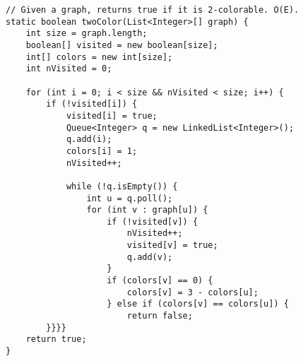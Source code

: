 \begin{verbatim}
// Given a graph, returns true if it is 2-colorable. O(E).
static boolean twoColor(List<Integer>[] graph) {
	int size = graph.length;
	boolean[] visited = new boolean[size];
	int[] colors = new int[size];
	int nVisited = 0;

	for (int i = 0; i < size && nVisited < size; i++) {
		if (!visited[i]) {
			visited[i] = true;
			Queue<Integer> q = new LinkedList<Integer>();
			q.add(i);
			colors[i] = 1;
			nVisited++;

			while (!q.isEmpty()) { 
				int u = q.poll();
				for (int v : graph[u]) { 
					if (!visited[v]) {
						nVisited++;
						visited[v] = true;
						q.add(v);
					}
					if (colors[v] == 0) {
						colors[v] = 3 - colors[u];
					} else if (colors[v] == colors[u]) {
						return false;
		}}}}
	return true;
}
\end{verbatim}